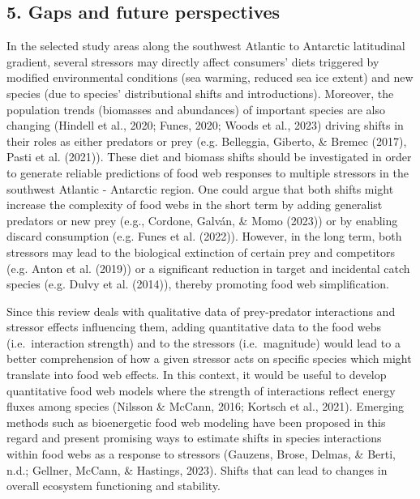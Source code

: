\documentclass[
]{article}
\begin{document}
\normalsize

\hypertarget{gaps-and-future-perspectives}{%
\subsection{5. Gaps and future
perspectives}\label{gaps-and-future-perspectives}}

In the selected study areas along the southwest Atlantic to Antarctic
latitudinal gradient, several stressors may directly affect consumers'
diets triggered by modified environmental conditions (sea warming,
reduced sea ice extent) and new species (due to species' distributional
shifts and introductions). Moreover, the population trends (biomasses
and abundances) of important species are also changing (Hindell et al.,
2020; Funes, 2020; Woods et al., 2023) driving shifts in their roles as
either predators or prey (e.g. Belleggia, Giberto, \& Bremec (2017),
Pasti et al. (2021)). These diet and biomass shifts should be
investigated in order to generate reliable predictions of food web
responses to multiple stressors in the southwest Atlantic - Antarctic
region. One could argue that both shifts might increase the complexity
of food webs in the short term by adding generalist predators or new
prey (e.g., Cordone, Galván, \& Momo (2023)) or by enabling discard
consumption (e.g. Funes et al. (2022)). However, in the long term, both
stressors may lead to the biological extinction of certain prey and
competitors (e.g. Anton et al. (2019)) or a significant reduction in
target and incidental catch species (e.g. Dulvy et al. (2014)), thereby
promoting food web simplification.

Since this review deals with qualitative data of prey-predator
interactions and stressor effects influencing them, adding quantitative
data to the food webs (i.e.~interaction strength) and to the stressors
(i.e.~magnitude) would lead to a better comprehension of how a given
stressor acts on specific species which might translate into food web
effects. In this context, it would be useful to develop quantitative
food web models where the strength of interactions reflect energy fluxes
among species (Nilsson \& McCann, 2016; Kortsch et al., 2021). Emerging
methods such as bioenergetic food web modeling have been proposed in
this regard and present promising ways to estimate shifts in species
interactions within food webs as a response to stressors (Gauzens,
Brose, Delmas, \& Berti, n.d.; Gellner, McCann, \& Hastings, 2023).
Shifts that can lead to changes in overall ecosystem functioning and
stability.
\end{document}
